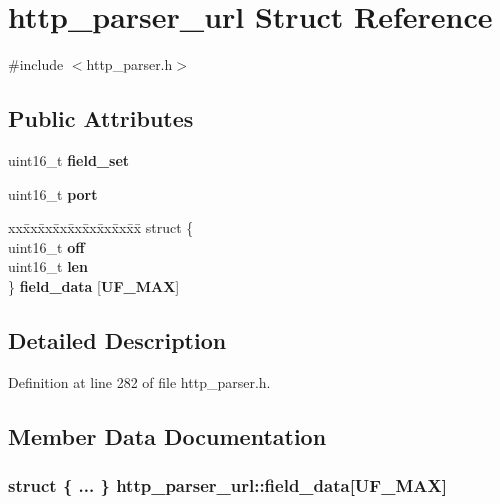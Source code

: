 \section{http\+\_\+parser\+\_\+url Struct Reference}
\label{structhttp__parser__url}


{\ttfamily \#include $<$http\+\_\+parser.\+h$>$}

\subsection*{Public Attributes}
\begin{DoxyCompactItemize}
\item 
uint16\+\_\+t {\bf field\+\_\+set}
\item 
uint16\+\_\+t {\bf port}
\item 
\begin{tabbing}
xx\=xx\=xx\=xx\=xx\=xx\=xx\=xx\=xx\=\kill
struct \{\\
\>uint16\_t {\bf off}\\
\>uint16\_t {\bf len}\\
\} {\bf field\_data} [{\bf UF\_MAX}]\\

\end{tabbing}\end{DoxyCompactItemize}


\subsection{Detailed Description}


Definition at line 282 of file http\+\_\+parser.\+h.



\subsection{Member Data Documentation}
\subsubsection[{field\+\_\+data}]{\setlength{\rightskip}{0pt plus 5cm}struct \{ ... \}   http\+\_\+parser\+\_\+url\+::field\+\_\+data[{\bf U\+F\+\_\+\+M\+AX}]}\label{structhttp__parser__url_a96a1fed71f3471692e9832f91b42f7db}


